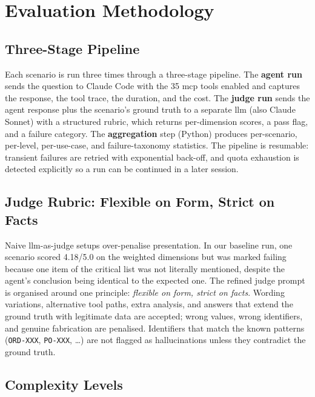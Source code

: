 
\chapter{Evaluation Methodology}
\label{ch:methodology}

\section{Three-Stage Pipeline}

Each scenario is run three times through a three-stage pipeline. The \textbf{agent run} sends the question to Claude Code with the 35 \gls{mcp} tools enabled and captures the response, the tool trace, the duration, and the cost. The \textbf{judge run} sends the agent response plus the scenario's ground truth to a separate \gls{llm} (also Claude Sonnet) with a structured rubric, which returns per-dimension scores, a pass flag, and a failure category. The \textbf{aggregation} step (Python) produces per-scenario, per-level, per-use-case, and failure-taxonomy statistics. The pipeline is resumable: transient failures are retried with exponential back-off, and quota exhaustion is detected explicitly so a run can be continued in a later session.

\section{Judge Rubric: Flexible on Form, Strict on Facts}

Naive \gls{llm}-as-judge setups over-penalise presentation. In our baseline run, one scenario scored 4.18/5.0 on the weighted dimensions but was marked failing because one item of the critical list was not literally mentioned, despite the agent's conclusion being identical to the expected one. The refined judge prompt is organised around one principle: \emph{flexible on form, strict on facts}. Wording variations, alternative tool paths, extra analysis, and answers that extend the ground truth with legitimate data are accepted; wrong values, wrong identifiers, and genuine fabrication are penalised. Identifiers that match the known patterns (\texttt{ORD-XXX}, \texttt{PO-XXX}, \ldots) are not flagged as hallucinations unless they contradict the ground truth.

\section{Complexity Levels}

